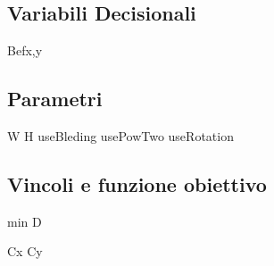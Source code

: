		\subsection{Variabili Decisionali}

		Bef{x,y}
		\subsection{Parametri}
		W
		H
		useBleding
		usePowTwo
		useRotation
		\subsection{Vincoli e funzione obiettivo}
		min D

		Cx Cy
		\newpage